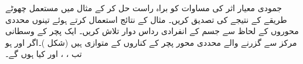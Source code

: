 جمودی معیار اثر کی مساوات  کو براہ راست حل کر کے  مثال  میں مستعمل چھوٹے    طریقے کے نتیجے کی تصدیق کریں۔   مثال  کے نتائج استعمال کرتے ہوئے  تینوں محددی محوروں کے لحاظ سے  جسم کے   انفرادی رداس دوار تلاش کریں۔ 
ایک پچر کے وسطانی مرکز سے   گزرنے والے محددی محور پچر کے کناروں کے متوازی ہیں  (شکل )۔اگر  اور  ہو  تب ، ،  اور  کیا ہوں گے۔
